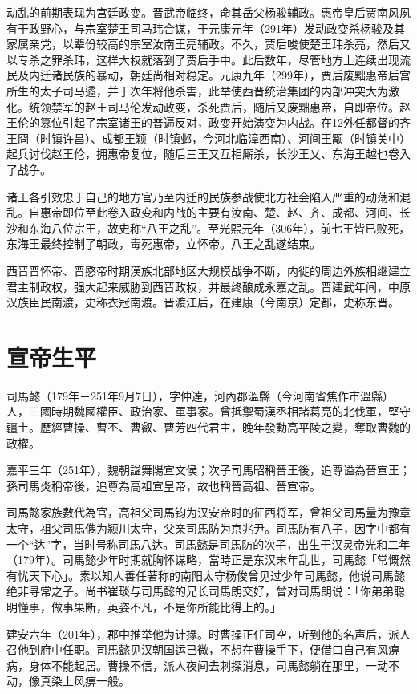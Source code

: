 动乱的前期表现为宫廷政变。晋武帝临终，命其岳父杨骏辅政。惠帝皇后贾南风夙有干政野心，与宗室楚王司马玮合谋，于元康元年（291年）发动政变杀杨骏及其家属亲党，以辈份较高的宗室汝南王亮辅政。不久，贾后唆使楚王玮杀亮，然后又以专杀之罪杀玮，这样大权就落到了贾后手中。此后数年，尽管地方上连续出现流民及内迁诸民族的暴动，朝廷尚相对稳定。元康九年（299年），贾后废黜惠帝后宫所生的太子司马遹，并于次年将他杀害，此举使西晋统治集团的内部冲突大为激化。统领禁军的赵王司马伦发动政变，杀死贾后，随后又废黜惠帝，自即帝位。赵王伦的篡位引起了宗室诸王的普遍反对，政变开始演变为内战。在12外任都督的齐王冏（时镇许昌）、成都王颖（时镇邺，今河北临漳西南）、河间王颙（时镇关中）起兵讨伐赵王伦，拥惠帝复位，随后三王又互相厮杀，长沙王乂、东海王越也卷入了战争。

诸王各引效忠于自己的地方官乃至内迁的民族参战使北方社会陷入严重的动荡和混乱。自惠帝即位至此卷入政变和内战的主要有汝南、楚、赵、齐、成都、河间、长沙和东海八位宗王，故史称“八王之乱”。至光熙元年（306年），前七王皆已败死，东海王最终控制了朝政，毒死惠帝，立怀帝。八王之乱遂结束。

西晋晋怀帝、晋愍帝时期漢族北部地区大规模战争不断，内徙的周边外族相继建立君主制政权，强大起来威胁到西晋政权，并最终酿成永嘉之乱。晋建武年间，中原汉族臣民南渡，史称衣冠南渡。晋渡江后，在建康（今南京）定都，史称东晋。

\section{宣帝生平}

司馬懿（179年－251年9月7日），字仲達，河內郡溫縣（今河南省焦作市溫縣）人，三國時期魏國權臣、政治家、軍事家。曾抵禦蜀漢丞相諸葛亮的北伐軍，堅守疆土。歷經曹操、曹丕、曹叡、曹芳四代君主，晚年發動高平陵之變，奪取曹魏的政權。

嘉平三年（251年），魏朝諡舞陽宣文侯；次子司馬昭稱晉王後，追尊谥為晉宣王；孫司馬炎稱帝後，追尊為高祖宣皇帝，故也稱晉高祖、晉宣帝。

司馬懿家族數代為官，高祖父司馬钧为汉安帝时的征西将军，曾祖父司馬量为豫章太守，祖父司馬儁为颍川太守，父亲司馬防为京兆尹。司馬防有八子，因字中都有一个“达”字，当时号称司馬八达。司馬懿是司馬防的次子，出生于汉灵帝光和二年（179年）。司馬懿少年时期就胸怀谋略，當時正是东汉末年乱世，司馬懿「常慨然有忧天下心」。素以知人善任著称的南阳太守杨俊曾见过少年司馬懿，他说司馬懿绝非寻常之子。尚书崔琰与司馬懿的兄长司馬朗交好，曾对司馬朗说：「你弟弟聪明懂事，做事果断，英姿不凡，不是你所能比得上的。」

建安六年（201年），郡中推举他为计掾。时曹操正任司空，听到他的名声后，派人召他到府中任职。司馬懿见汉朝国运已微，不想在曹操手下，便借口自己有风痹病，身体不能起居。曹操不信，派人夜间去刺探消息，司馬懿躺在那里，一动不动，像真染上风痹一般。

